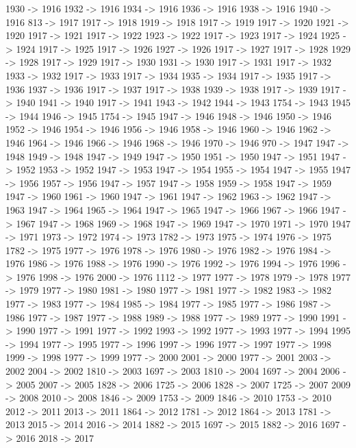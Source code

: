 {	1930 -> 1916
	1932 -> 1916
	1934 -> 1916
	1936 -> 1916
	1938 -> 1916
	1940 -> 1916
	813 -> 1917
	1917 -> 1918
	1919 -> 1918
	1917 -> 1919
	1917 -> 1920
	1921 -> 1920
	1917 -> 1921
	1917 -> 1922
	1923 -> 1922
	1917 -> 1923
	1917 -> 1924
	1925 -> 1924
	1917 -> 1925
	1917 -> 1926
	1927 -> 1926
	1917 -> 1927
	1917 -> 1928
	1929 -> 1928
	1917 -> 1929
	1917 -> 1930
	1931 -> 1930
	1917 -> 1931
	1917 -> 1932
	1933 -> 1932
	1917 -> 1933
	1917 -> 1934
	1935 -> 1934
	1917 -> 1935
	1917 -> 1936
	1937 -> 1936
	1917 -> 1937
	1917 -> 1938
	1939 -> 1938
	1917 -> 1939
	1917 -> 1940
	1941 -> 1940
	1917 -> 1941
	1943 -> 1942
	1944 -> 1943
	1754 -> 1943
	1945 -> 1944
	1946 -> 1945
	1754 -> 1945
	1947 -> 1946
	1948 -> 1946
	1950 -> 1946
	1952 -> 1946
	1954 -> 1946
	1956 -> 1946
	1958 -> 1946
	1960 -> 1946
	1962 -> 1946
	1964 -> 1946
	1966 -> 1946
	1968 -> 1946
	1970 -> 1946
	970 -> 1947
	1947 -> 1948
	1949 -> 1948
	1947 -> 1949
	1947 -> 1950
	1951 -> 1950
	1947 -> 1951
	1947 -> 1952
	1953 -> 1952
	1947 -> 1953
	1947 -> 1954
	1955 -> 1954
	1947 -> 1955
	1947 -> 1956
	1957 -> 1956
	1947 -> 1957
	1947 -> 1958
	1959 -> 1958
	1947 -> 1959
	1947 -> 1960
	1961 -> 1960
	1947 -> 1961
	1947 -> 1962
	1963 -> 1962
	1947 -> 1963
	1947 -> 1964
	1965 -> 1964
	1947 -> 1965
	1947 -> 1966
	1967 -> 1966
	1947 -> 1967
	1947 -> 1968
	1969 -> 1968
	1947 -> 1969
	1947 -> 1970
	1971 -> 1970
	1947 -> 1971
	1973 -> 1972
	1974 -> 1973
	1782 -> 1973
	1975 -> 1974
	1976 -> 1975
	1782 -> 1975
	1977 -> 1976
	1978 -> 1976
	1980 -> 1976
	1982 -> 1976
	1984 -> 1976
	1986 -> 1976
	1988 -> 1976
	1990 -> 1976
	1992 -> 1976
	1994 -> 1976
	1996 -> 1976
	1998 -> 1976
	2000 -> 1976
	1112 -> 1977
	1977 -> 1978
	1979 -> 1978
	1977 -> 1979
	1977 -> 1980
	1981 -> 1980
	1977 -> 1981
	1977 -> 1982
	1983 -> 1982
	1977 -> 1983
	1977 -> 1984
	1985 -> 1984
	1977 -> 1985
	1977 -> 1986
	1987 -> 1986
	1977 -> 1987
	1977 -> 1988
	1989 -> 1988
	1977 -> 1989
	1977 -> 1990
	1991 -> 1990
	1977 -> 1991
	1977 -> 1992
	1993 -> 1992
	1977 -> 1993
	1977 -> 1994
	1995 -> 1994
	1977 -> 1995
	1977 -> 1996
	1997 -> 1996
	1977 -> 1997
	1977 -> 1998
	1999 -> 1998
	1977 -> 1999
	1977 -> 2000
	2001 -> 2000
	1977 -> 2001
	2003 -> 2002
	2004 -> 2002
	1810 -> 2003
	1697 -> 2003
	1810 -> 2004
	1697 -> 2004
	2006 -> 2005
	2007 -> 2005
	1828 -> 2006
	1725 -> 2006
	1828 -> 2007
	1725 -> 2007
	2009 -> 2008
	2010 -> 2008
	1846 -> 2009
	1753 -> 2009
	1846 -> 2010
	1753 -> 2010
	2012 -> 2011
	2013 -> 2011
	1864 -> 2012
	1781 -> 2012
	1864 -> 2013
	1781 -> 2013
	2015 -> 2014
	2016 -> 2014
	1882 -> 2015
	1697 -> 2015
	1882 -> 2016
	1697 -> 2016
	2018 -> 2017
}
